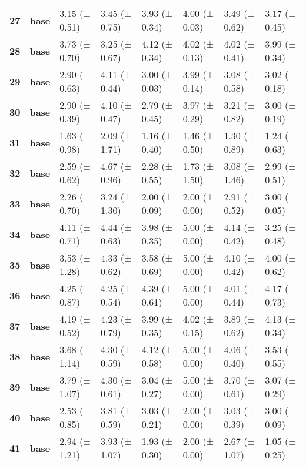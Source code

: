 \begin{longtable}{llllllll}
\cline{1-8}
\textbf{27} & \textbf{base} & 3.15 (± 0.51) & 3.45 (± 0.75) & 3.93 (± 0.34) & 4.00 (± 0.03) & 3.49 (± 0.62) & 3.17 (± 0.45) \\
\cline{1-8}
\textbf{28} & \textbf{base} & 3.73 (± 0.70) & 3.25 (± 0.67) & 4.12 (± 0.34) & 4.02 (± 0.13) & 4.02 (± 0.41) & 3.99 (± 0.34) \\
\cline{1-8}
\textbf{29} & \textbf{base} & 2.90 (± 0.63) & 4.11 (± 0.44) & 3.00 (± 0.03) & 3.99 (± 0.14) & 3.08 (± 0.58) & 3.02 (± 0.18) \\
\cline{1-8}
\textbf{30} & \textbf{base} & 2.90 (± 0.39) & 4.10 (± 0.47) & 2.79 (± 0.45) & 3.97 (± 0.29) & 3.21 (± 0.82) & 3.00 (± 0.19) \\
\cline{1-8}
\textbf{31} & \textbf{base} & 1.63 (± 0.98) & 2.09 (± 1.71) & 1.16 (± 0.40) & 1.46 (± 0.50) & 1.30 (± 0.89) & 1.24 (± 0.63) \\
\cline{1-8}
\textbf{32} & \textbf{base} & 2.59 (± 0.62) & 4.67 (± 0.96) & 2.28 (± 0.55) & 1.73 (± 1.50) & 3.08 (± 1.46) & 2.99 (± 0.51) \\
\cline{1-8}
\textbf{33} & \textbf{base} & 2.26 (± 0.70) & 3.24 (± 1.30) & 2.00 (± 0.09) & 2.00 (± 0.00) & 2.91 (± 0.52) & 3.00 (± 0.05) \\
\cline{1-8}
\textbf{34} & \textbf{base} & 4.11 (± 0.71) & 4.44 (± 0.63) & 3.98 (± 0.35) & 5.00 (± 0.00) & 4.14 (± 0.42) & 3.25 (± 0.48) \\
\cline{1-8}
\textbf{35} & \textbf{base} & 3.53 (± 1.28) & 4.33 (± 0.62) & 3.58 (± 0.69) & 5.00 (± 0.00) & 4.10 (± 0.42) & 4.00 (± 0.62) \\
\cline{1-8}
\textbf{36} & \textbf{base} & 4.25 (± 0.87) & 4.25 (± 0.54) & 4.39 (± 0.61) & 5.00 (± 0.00) & 4.01 (± 0.44) & 4.17 (± 0.73) \\
\cline{1-8}
\textbf{37} & \textbf{base} & 4.19 (± 0.52) & 4.23 (± 0.79) & 3.99 (± 0.35) & 4.02 (± 0.15) & 3.89 (± 0.62) & 4.13 (± 0.34) \\
\cline{1-8}
\textbf{38} & \textbf{base} & 3.68 (± 1.14) & 4.30 (± 0.59) & 4.12 (± 0.58) & 5.00 (± 0.00) & 4.06 (± 0.40) & 3.53 (± 0.55) \\
\cline{1-8}
\textbf{39} & \textbf{base} & 3.79 (± 1.07) & 4.30 (± 0.61) & 3.04 (± 0.27) & 5.00 (± 0.00) & 3.70 (± 0.61) & 3.07 (± 0.29) \\
\cline{1-8}
\textbf{40} & \textbf{base} & 2.53 (± 0.85) & 3.81 (± 0.59) & 3.03 (± 0.21) & 2.00 (± 0.00) & 3.03 (± 0.39) & 3.00 (± 0.09) \\
\cline{1-8}
\textbf{41} & \textbf{base} & 2.94 (± 1.21) & 3.93 (± 1.07) & 1.93 (± 0.30) & 2.00 (± 0.00) & 2.67 (± 1.07) & 1.05 (± 0.25) \\

\end{longtable}
